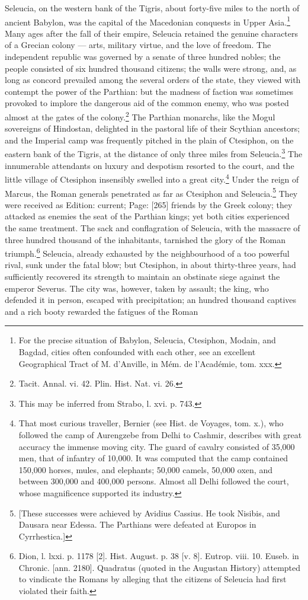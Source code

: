 Seleucia, on the western bank of the Tigris, about forty-five miles to the north of ancient Babylon, was the capital of the Macedonian conquests in Upper Asia.\footnote{For the precise situation of Babylon, Seleucia, Ctesiphon, Modain, and Bagdad, cities often confounded with each other, see an excellent Geographical Tract of M. d\texthebrew{}’Anville, in Mém. de l\texthebrew{}’Académie, tom. xxx.} Many ages after the fall of their empire, Seleucia retained the genuine characters of a Grecian colony \texthebrew{—} arts, military virtue, and the love of freedom. The independent republic was governed by a senate of three hundred nobles; the people consisted of six hundred thousand citizens; the walls were strong, and, as long as concord prevailed among the several orders of the state, they viewed with contempt the power of the Parthian: but the madness of faction was sometimes provoked to implore the dangerous aid of the common enemy, who was posted almost at the gates of the colony.\footnote{Tacit. Annal. vi. 42. Plin. Hist. Nat. vi. 26.} The Parthian monarchs, like the Mogul sovereigns of Hindostan, delighted in the pastoral life of their Scythian ancestors; and the Imperial camp was frequently pitched in the plain of Ctesiphon, on the eastern bank of the Tigris, at the distance of only three miles from Seleucia.\footnote{This may be inferred from Strabo, l. xvi. p. 743.} The innumerable attendants on luxury and despotism resorted to the court, and the little village of Ctesiphon insensibly swelled into a great city.\footnote{That most curious traveller, Bernier (see Hist. de Voyages, tom. x.), who followed the camp of Aurengzebe from Delhi to Cashmir, describes with great accuracy the immense moving city. The guard of cavalry consisted of 35,000 men, that of infantry of 10,000. It was computed that the camp contained 150,000 horses, mules, and elephants; 50,000 camels, 50,000 oxen, and between 300,000 and 400,000 persons. Almost all Delhi followed the court, whose magnificence supported its industry.} Under the reign of Marcus, the Roman generals penetrated as far as Ctesiphon and Seleucia.\footnote{[These successes were achieved by Avidius Cassius. He took Nisibis, and Dausara near Edessa. The Parthians were defeated at Europos in Cyrrhestica.]} They were received as Edition: current; Page: [265] friends by the Greek colony; they attacked as enemies the seat of the Parthian kings; yet both cities experienced the same treatment. The sack and conflagration of Seleucia, with the massacre of three hundred thousand of the inhabitants, tarnished the glory of the Roman triumph.\footnote{Dion, l. lxxi. p. 1178 [2]. Hist. August. p. 38 [v. 8]. Eutrop. viii. 10. Euseb. in Chronic. [ann. 2180]. Quadratus (quoted in the Augustan History) attempted to vindicate the Romans by alleging that the citizens of Seleucia had first violated their faith.} Seleucia, already exhausted by the neighbourhood of a too powerful rival, sunk under the fatal blow; but Ctesiphon, in about thirty-three years, had sufficiently recovered its strength to maintain an obstinate siege against the emperor Severus. The city was, however, taken by assault; the king, who defended it in person, escaped with precipitation; an hundred thousand captives and a rich booty rewarded the fatigues of the Roman 